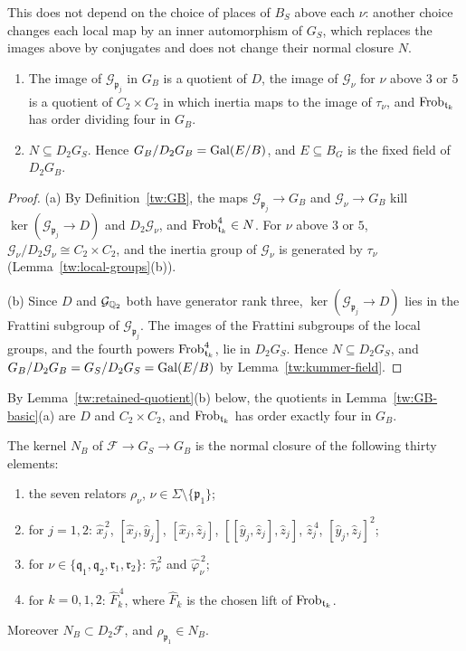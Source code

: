 This does not depend on the choice of places of $B_S$ above each $\nu$:
another choice changes each local map by an inner automorphism of $G_S$,
which replaces the images above by conjugates and does not change their
normal closure $N$.

\begin{lemma}\label{tw:GB-basic}
\begin{enumerate}
\item[(a)] The image of $\mathcal G_{\mathfrak p_j}$ in $G_B$ is a quotient of
 $D$, the image of $\mathcal G_\nu$ for $\nu$ above $3$ or $5$ is a quotient of
 $C_2\times C_2$ in which inertia maps to the image of $\tau_\nu$, and
 $\operatorname{Frob}_{\mathfrak t_k}$ has order dividing four in $G_B$.
\item[(b)] $N\subseteq D_2G_S$. Hence $G_B/D_2G_B=\operatorname{Gal}(E/B)$, and $E\subseteq B_G$
 is the fixed field of $D_2G_B$.
\end{enumerate}
\end{lemma}

\begin{proof}
(a) By Definition~\ref{tw:GB}, the maps $\mathcal G_{\mathfrak p_j}\to G_B$
and $\mathcal G_\nu\to G_B$ kill $\ker(\mathcal G_{\mathfrak p_j}\to D)$ and
$D_2\mathcal G_\nu$, and $\operatorname{Frob}_{\mathfrak t_k}^4\in N$. For $\nu$ above $3$
or $5$, $\mathcal G_\nu/D_2\mathcal G_\nu\cong C_2\times C_2$, and the inertia
group of $\mathcal G_\nu$ is generated by $\tau_\nu$
(Lemma~\ref{tw:local-groups}(b)).

(b) Since $D$ and $\mathcal G_{\mathbb Q_2}$ both have generator rank three,
$\ker(\mathcal G_{\mathfrak p_j}\to D)$ lies in the Frattini subgroup of
$\mathcal G_{\mathfrak p_j}$. The images of the Frattini subgroups of the
local groups, and the fourth powers $\operatorname{Frob}_{\mathfrak t_k}^4$, lie in
$D_2G_S$. Hence $N\subseteq D_2G_S$, and $G_B/D_2G_B=G_S/D_2G_S=\operatorname{Gal}(E/B)$ by
Lemma~\ref{tw:kummer-field}.
\end{proof}

By Lemma~\ref{tw:retained-quotient}(b) below, the quotients in
Lemma~\ref{tw:GB-basic}(a) are $D$ and $C_2\times C_2$, and
$\operatorname{Frob}_{\mathfrak t_k}$ has order exactly four in $G_B$.

\begin{lemma}\label{tw:GB-presentation}
The kernel $N_B$ of $\mathcal F\to G_S\to G_B$ is the normal closure
of the following thirty elements:
\begin{enumerate}
\item[(i)] the seven relators $\rho_\nu$, $\nu\in\Sigma\setminus\{\mathfrak p_1\}$;
\item[(ii)] for $j=1,2$: $\hat x_j^{\,2}$, $[\hat x_j,\hat y_j]$,
 $[\hat x_j,\hat z_j]$, $[[\hat y_j,\hat z_j],\hat z_j]$, $\hat z_j^{\,4}$,
 $[\hat y_j,\hat z_j]^2$;
\item[(iii)] for $\nu\in\{\mathfrak q_1,\mathfrak q_2,\mathfrak r_1,\mathfrak r_2\}$:
 $\hat\tau_\nu^{\,2}$ and $\hat\varphi_\nu^{\,2}$;
\item[(iv)] for $k=0,1,2$: $\hat F_k^{\,4}$, where $\hat F_k$ is the chosen
 lift of $\operatorname{Frob}_{\mathfrak t_k}$.
\end{enumerate}
Moreover $N_B\subset D_2\mathcal F$, and $\rho_{\mathfrak p_1}\in N_B$.
\end{lemma}

